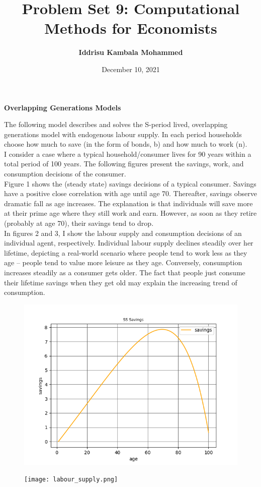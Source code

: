 \documentclass[a4paper, 12pt]{article}
\title{\textbf {Problem Set 9: Computational Methods for Economists}}
\author{\textbf {Iddrisu Kambala Mohammed}}
\date{December 10, 2021}
\begin{document}
	\maketitle
	\begin{center}
		\textbf{Overlapping Generations Models}
	\end{center}
	The following model describes and solves the S-period lived, overlapping generations model with endogenous labour supply. In each period households choose how much to save (in the form of bonds, b) and how much to work (n). \\
	I consider a case where a typical household/consumer lives for 90 years within a total period of 100 years. The following figures present the savings, work, and consumption decisions of the consumer. \\
	Figure 1 shows the (steady state) savings decisions of a typical consumer. Savings have a positive close correlation with age until age 70. Thereafter, savings observe dramatic fall as age increases. The explanation is that individuals will save more at their prime age where they still work and earn. However, as soon as they retire (probably at age 70), their savings tend to drop. \\
	In figures 2 and 3, I show the labour supply and consumption decisions of an individual agent, respectively.  Individual labour supply  declines steadily over her lifetime, depicting a real-world scenario where people tend to work less as they age -- people tend to value more leisure as they age. Conversely, consumption increases steadily as a consumer gets older. The fact that people just consume their lifetime savings when they get old may explain the increasing trend of consumption. \\
	\begin{figure}
		\centering
		\includegraphics[width=5in]{savings.png}
		\caption{}
		\texttt{[image: labour\_supply.png]}
		\caption{}
	\end{figure} 
\end{document}
